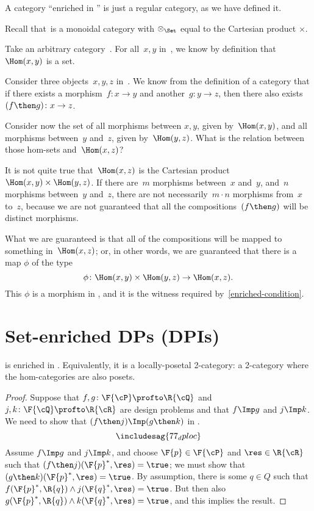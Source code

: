 \begin{example}
A category ``enriched in \Set'' is just a regular category, as we have defined it.

Recall that~\Set is a monoidal category with $\otimes_{\Set}$ equal to the Cartesian product $\times$.

Take an arbitrary category~\CatC. For all~$x, y$ in~\CatC, we know by definition
that~$\Hom(x,y)$ is a set.

Consider three objects~$x,y,z$ in~\CatC. We know from the definition of a
category that if there exists a morphism~$f: x \to y$ and another~$g: y \to z$,
then there also exists~$(f\then g)\colon x \to z$.

Consider now the set of all morphisms between $x, y$, given by~$\Hom(x,y)$, and
all morphisms between~$y$ and~$z$, given by~$\Hom(y, z)$. What is the relation
between those hom-sets and~$\Hom(x, z)$?

It is not quite true that~$\Hom(x, z)$ is the Cartesian product~$\Hom(x, y)
\times \Hom(y, z)$. If there are~$m$ morphisms between~$x$ and~$y$, and~$n$
morphisms between~$y$ and~$z$, there are not necessarily~$m \cdot n$ morphisms
from~$x$ to~$z$, because we are not guaranteed that all the compositions~$(f\then g)$
will be distinct morphisms.

What we are guaranteed is that all of the compositions will be mapped to something in~$\Hom(x, z)$; or, in other words, we are guaranteed that there
is a map $\phi$ of the type
\begin{equation}
\phi \colon \Hom(x, y) \times \Hom(y, z) \rightarrow \Hom(x, z).
\end{equation}
This $\phi$ is a morphism in \Set, and it is the witness required by~\eqref{enriched-condition}.

\end{example}


\clearpage

\section{Set-enriched DPs (DPIs)}

\begin{proposition}
\label{prop:DP_loc_pos}
\DP is enriched in \Pos. Equivalently, it is a locally-posetal 2-category: a 2-category where the hom-categories are also posets.
\end{proposition}
\begin{proof}
Suppose that $f,g\colon \F{\cP} \profto \R{\cQ}$ and $j,k\colon \F{\cQ} \profto \R{\cR}$ are design problems and that $f\Imp g$ and $j\Imp k$. We need to show that $(f\then j)\Imp(g\then k)$ in \DP.
\begin{equation}
\includesag{77_dploc}
\end{equation}
Assume $f\Imp g$ and $j\Imp k$, and choose $\F{p}\in\F{\cP} $ and $\res\in\R{\cR}$ such that $(f\then j)(\F{p}^*,\res)=\true$; we must show that $(g \then k)(\F{p}^*,\res)=\true$. By assumption, there is some $q\in Q$ such that $f(\F{p}^*,\R{q})\wedge j(\F{q}^*,\res)=\true$. But then also $g(\F{p}^*,\R{q})\wedge k(\F{q}^*,\res)=\true$, and this implies the result.
\end{proof}

